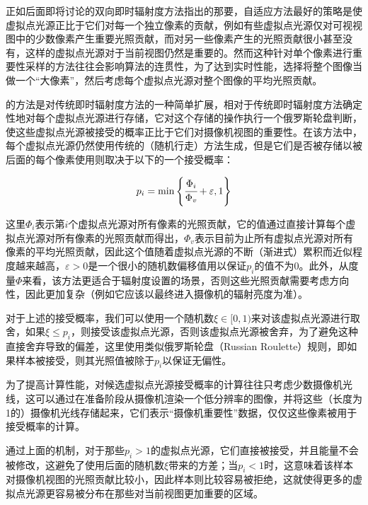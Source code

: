 正如后面即将讨论的双向即时辐射度方法\cite{a:BidirectionalInstantRadiosity}指出的那要，自适应方法最好的策略是使虚拟点光源正比于它们对每一个独立像素的贡献，例如有些虚拟点光源仅对可视视图中的少数像素产生重要光照贡献，而对另一些像素产生的光照贡献很小甚至没有，这样的虚拟点光源对于当前视图仍然是重要的。然而这种针对单个像素进行重要性采样的方法往往会影响算法的连贯性，为了达到实时性能，\cite{a:SimpleandRobustIterativeImportanceSamplingofVirtualPointLights}选择将整个图像当做一个“大像素”，然后考虑每个虚拟点光源对整个图像的平均光照贡献。

\cite{a:SimpleandRobustIterativeImportanceSamplingofVirtualPointLights}的方法是对传统即时辐射度方法的一种简单扩展，相对于传统即时辐射度方法确定性地对每个虚拟点光源进行存储，它对这个存储的操作执行一个俄罗斯轮盘判断，使这些虚拟点光源被接受的概率正比于它们对摄像机视图的重要性。在该方法中，每个虚拟点光源仍然使用传统的（随机行走）方法生成，但是它们是否被存储以被后面的每个像素使用则取决于以下的一个接受概率：

\begin{equation}\label{e:ir-accept-probability}
	p_i=\min\Bigg\{ \cfrac{\Phi_i}{\Phi_v}+\varepsilon,1\Bigg\}
\end{equation}

\noindent 这里$\Phi_i$表示第$i$个虚拟点光源对所有像素的光照贡献，它的值通过直接计算每个虚拟点光源对所有像素的光照贡献而得出，$\Phi_v$表示目前为止所有虚拟点光源对所有像素的平均光照贡献，因此这个值随着虚拟点光源的不断（渐进式）累积而近似程度越来越高，$\varepsilon>0$是一个很小的随机数偏移值用以保证$p_i$的值不为0。此外，从度量$\Phi$来看，该方法更适合于辐射度设置的场景，否则这些光照贡献需要考虑方向性，因此更加复杂（例如它应该以最终进入摄像机的辐射亮度为准）。

对于上述的接受概率，我们可以使用一个随机数$\xi\in[0,1)$来对该虚拟点光源进行取舍，如果$\xi\leq p_i$，则接受该虚拟点光源，否则该虚拟点光源被舍弃，为了避免这种直接舍弃导致的偏差，这里使用类似俄罗斯轮盘（Russian Roulette）规则，即如果样本被接受，则其光照值被除于$p_i$以保证无偏性。

为了提高计算性能，对候选虚拟点光源接受概率的计算往往只考虑少数摄像机光线，这可以通过在准备阶段从摄像机渲染一个低分辨率的图像，并将这些（长度为1的）摄像机光线存储起来，它们表示“摄像机重要性”数据，仅仅这些像素被用于接受概率的计算。

通过上面的机制，对于那些$p_i >1$的虚拟点光源，它们直接被接受，并且能量不会被修改，这避免了使用后面的随机数$\xi$带来的方差；当$p_i<1$时，这意味着该样本对摄像机视图的光照贡献比较小，因此样本则比较容易被拒绝，这就使得更多的虚拟点光源更容易被分布在那些对当前视图更加重要的区域。

